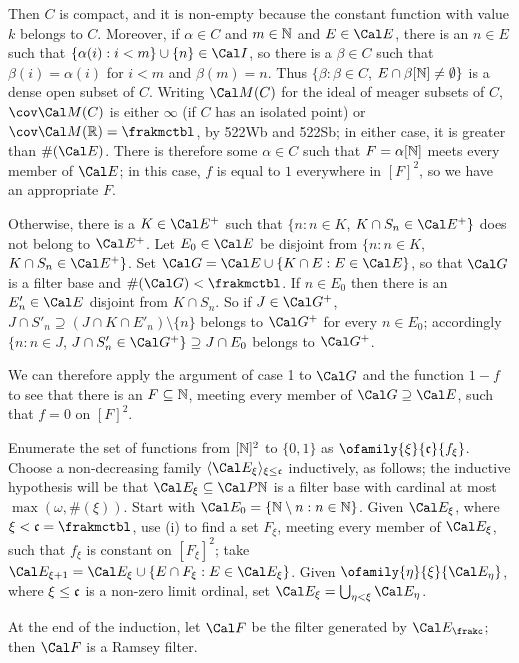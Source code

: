 {

\noindent Then $C$ is compact, and it is non-empty because the constant
function with value $k$ belongs to $C$.   Moreover, if $\alpha\in C$ and
$m\in\Bbb N$ and $E\in\Cal E$, there is an $n\in E$ such that
$\{\alpha(i):i<m\}\cup\{n\}\in\Cal I$, so there is a $\beta\in C$ such that
$\beta(i)=\alpha(i)$ for $i<m$ and $\beta(m)=n$.   Thus
$\{\beta:\beta\in C$, $E\cap\beta[\Bbb N]\ne\emptyset\}$ is a dense open
subset of $C$.   Writing $\Cal M(C)$ for the ideal of meager subsets of
$C$, $\cov\Cal M(C)$ is either $\infty$ (if $C$ has an isolated point)
or $\cov\Cal M(\Bbb R)=\frakmctbl$, by 522Wb and 522Sb;
in either case, it is greater than
$\#(\Cal E)$.   There is therefore some $\alpha\in C$ such that
$F=\alpha[\Bbb N]$ meets every member of $\Cal E$;  in this case,
$f$ is equal to $1$ everywhere in $[F]^2$, so we have an appropriate $F$.

\medskip

 Otherwise, there is a $K\in\Cal E^+$ such that
$\{n:n\in K$, $K\cap S_n\in\Cal E^+\}$ does not belong to $\Cal E^+$.
Let $E_0\in\Cal E$ be disjoint from
$\{n:n\in K$, $K\cap S_n\in\Cal E^+\}$.
Set $\Cal G=\Cal E\cup\{K\cap E:E\in\Cal E\}$,
so that $\Cal G$ is a filter base and $\#(\Cal G)<\frakmctbl$.
If $n\in E_0$ then there is an
$E'_n\in\Cal E$ disjoint from $K\cap S_n$.
So if $J\in\Cal G^+$,
$J\cap S'_n\supseteq(J\cap K\cap E'_n)\setminus\{n\}$ belongs to
$\Cal G^+$ for every $n\in E_0$;  accordingly
$\{n:n\in J$, $J\cap S'_n\in\Cal G^+\}\supseteq J\cap E_0$
belongs to $\Cal G^+$.

We can therefore apply the argument of case 1 to $\Cal G$ and
the function $1-f$ to see that there is an $F\subseteq\Bbb N$, meeting
every member of $\Cal G\supseteq\Cal E$, such that $f=0$ on
$[F]^2$.\ \Qed

\medskip

Enumerate the set of functions from $[\Bbb N]^2$ to $\{0,1\}$ as
$\ofamily{\xi}{\frak c}{f_{\xi}}$.   Choose a non-decreasing family
$\langle\Cal E_{\xi}\rangle_{\xi\le\frak c}$ inductively, as follows;
the inductive
hypothesis will be that $\Cal E_{\xi}\subseteq\Cal P\Bbb N$ is a
filter base with cardinal at most $\max(\omega,\#(\xi))$.
Start with $\Cal E_0=\{\Bbb N\setminus n:n\in\Bbb N\}$.
Given $\Cal E_{\xi}$, where $\xi<\frak c=\frakmctbl$,
use (i) to find a set $F_{\xi}$, meeting every member of $\Cal E_{\xi}$,
such that $f_{\xi}$ is constant on $[F_{\xi}]^2$;  take
$\Cal E_{\xi+1}=\Cal E_{\xi}\cup\{E\cap F_{\xi}:E\in\Cal E_{\xi}\}$.
Given $\ofamily{\eta}{\xi}{\Cal E_{\eta}}$, where $\xi\le\frak c$ is a
non-zero limit ordinal, set $\Cal E_{\xi}=\bigcup_{\eta<\xi}\Cal E_{\eta}$.

At the end of the induction, let $\Cal F$ be the filter generated by
$\Cal E_{\frakc}$;  then $\Cal F$ is a Ramsey filter.
}%

